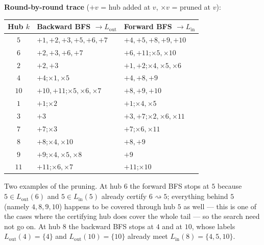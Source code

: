\documentclass[11pt]{article}
\begin{document}
\medskip
\noindent\textbf{Round-by-round trace} ($+v$ = hub added at $v$, $\times v$ = pruned at $v$):

\begin{center}
\begin{tabular}{c l l}
\toprule
\rowcolor{white}
Hub $k$ & Backward BFS $\rightarrow L_{\mathrm{out}}$ & Forward BFS $\rightarrow L_{\mathrm{in}}$ \\
\midrule
$5$  & $+1,+2,+3,+5,+6,+7$ & $+4,+5,+8,+9,+10$ \\
$6$  & $+2,+3,+6,+7$ & $+6,+11$;\quad $\times 5,\times 10$ \\
$2$  & $+2,+3$ & $+1,+2$;\quad $\times 4,\times 5,\times 6$ \\
$4$  & $+4$;\quad $\times 1,\times 5$ & $+4,+8,+9$ \\
$10$ & $+10,+11$;\quad $\times 5,\times 6,\times 7$ & $+8,+9,+10$ \\
$1$  & $+1$;\quad $\times 2$ & $+1$;\quad $\times 4,\times 5$ \\
$3$  & $+3$ & $+3,+7$;\quad $\times 2,\times 6,\times 11$ \\
$7$  & $+7$;\quad $\times 3$ & $+7$;\quad $\times 6,\times 11$ \\
$8$  & $+8$;\quad $\times 4,\times 10$ & $+8,+9$ \\
$9$  & $+9$;\quad $\times 4,\times 5,\times 8$ & $+9$ \\
$11$ & $+11$;\quad $\times 6,\times 7$ & $+11$;\quad $\times 10$ \\
\bottomrule
\end{tabular}
\end{center}

\noindent Two examples of the pruning. At hub $6$ the forward BFS stops at $5$ because
$5\in L_{\mathrm{out}}(6)$ and $5\in L_{\mathrm{in}}(5)$ already certify $6\rightsquigarrow 5$;
everything behind $5$ (namely $4,8,9,10$) happens to be covered through hub $5$ as well ---
this is one of the cases where the certifying hub does cover the whole tail --- so the
search need not go on. At hub $8$ the backward BFS stops at $4$ and at $10$, whose labels
$L_{\mathrm{out}}(4)=\{4\}$ and $L_{\mathrm{out}}(10)=\{10\}$ already meet
$L_{\mathrm{in}}(8)=\{4,5,10\}$.
\end{document}

